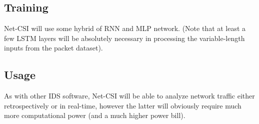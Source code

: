 \documentclass{article}
\begin{document}
\subsection*{Training}
Net-CSI will use some hybrid of RNN and MLP network. (Note that at least a few LSTM layers will be absolutely necessary in processing the variable-length inputs from the packet dataset).

\subsection*{Usage}
As with other IDS software, Net-CSI will be able to analyze network traffic either retrospectively or in real-time, however the latter will obviously require much more computational power (and a much higher power bill).
\end{document}
